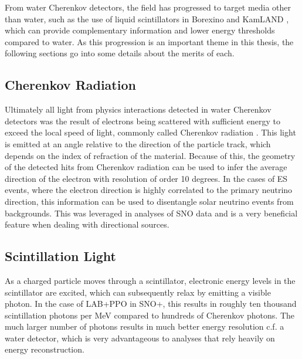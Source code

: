 From water Cherenkov detectors, the field has progressed to target media other than water, such as the use of liquid scintillators in Borexino \cite{borexino} and KamLAND \cite{kamland}, which can provide complementary information and lower energy thresholds compared to water.
As this progression is an important theme in this thesis, the following sections go into some details about the merits of each.

\subsection{Cherenkov Radiation}

Ultimately all light from physics interactions detected in water Cherenkov detectors was the result of electrons being scattered with sufficient energy to exceed the local speed of light, commonly called Cherenkov radiation \cite{cherenkov}.
This light is emitted at an angle relative to the direction of the particle track, which depends on the index of refraction of the material.
Because of this, the geometry of the detected hits from Cherenkov radiation can be used to infer the average direction of the electron with resolution of order 10 degrees.
In the cases of ES events, where the electron direction is highly correlated to the primary neutrino direction, this information can be used to disentangle solar neutrino events from backgrounds.
This was leveraged in analyses of SNO data and is a very beneficial feature when dealing with directional sources.

\subsection{Scintillation Light}

As a charged particle moves through a scintillator, electronic energy levels in the scintillator are excited, which can subsequently relax by emitting a visible photon.
In the case of LAB+PPO in SNO+, this results in roughly ten thousand scintillation photons per MeV compared to hundreds of Cherenkov photons.
The much larger number of photons results in much better energy resolution c.f. a water detector, which is very advantageous to analyses that rely heavily on energy reconstruction.

